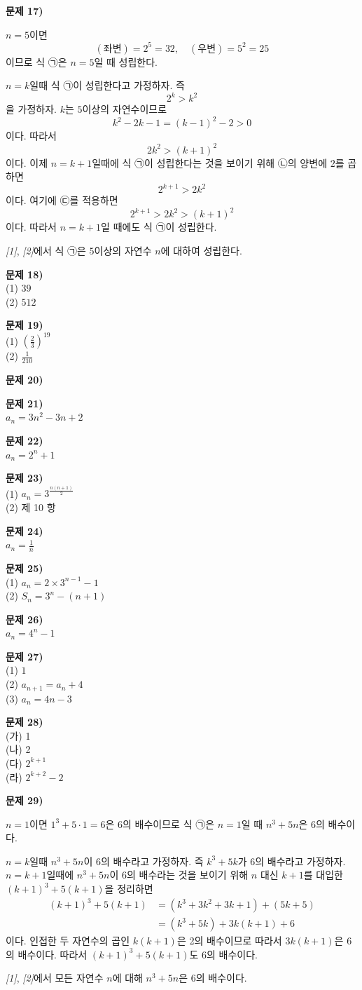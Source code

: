 \documentclass{oblivoir}
\newcounter{num}
\newcommand\an[1]{\par\bigskip\noindent\textbf{문제 #1)}\\}
\begin{document}
%
\an{17}
\begin{enumerate}[label=\emph{[\arabic*]}]
\item
\(n=5\)이면
\[(좌변)=2^5=32,\quad (우변)=5^2=25\]
이므로 식 ㉠은 \(n=5\)일 때 성립한다.
\item
\(n=k\)일때 식 ㉠이 성립한다고 가정하자.
즉
\[2^k>k^2\tag{㉡}\]
을 가정하자.
\(k\)는 \(5\)이상의 자연수이므로
\[k^2-2k-1=(k-1)^2-2>0\tag{㉢}\]
이다.
따라서
\[2k^2>(k+1)^2\]
이다.
이제 \(n=k+1\)일때에 식 ㉠이 성립한다는 것을 보이기 위해 ㉡의 양변에 \(2\)를 곱하면
\[2^{k+1}>2k^2\]
이다.
여기에 ㉢를 적용하면
\[2^{k+1}>2k^2>(k+1)^2\]
이다.
따라서 \(n=k+1\)일 때에도 식 ㉠이 성립한다.
\end{enumerate}
\emph{[1]}, \emph{[2]}에서 식 ㉠은 \(5\)이상의 자연수 \(n\)에 대하여 성립한다.

%
\an{18}
(1) \(39\)\\
(2) \(512\)

%
\an{19}
(1) \(\left(\frac23\right)^{19}\)\\
(2) \(\frac1{210}\)

%
\an{20}

%
\an{21}
\(a_n=3n^2-3n+2\)

%
\an{22}
\(a_n=2^n+1\)

%
\an{23}
(1) \(a_n=3^{\frac{n(n+1)}2}\)\\
(2) 제 10 항

%
\an{24}
\(a_n=\frac1n\)

%
\an{25}
(1) \(a_n=2\times3^{n-1}-1\)\\
(2) \(S_n=3^n-(n+1)\)

%
\an{26}
\(a_n=4^n-1\)

%
\an{27}
(1) \(1\)\\
(2) \(a_{n+1}=a_n+4\)\\
(3) \(a_n=4n-3\)

%
\an{28}
(가) 1\\
(나) 2\\
(다) \(2^{k+1}\)\\
(라) \(2^{k+2}-2\)

%
\an{29}
\begin{enumerate}[label=\emph{[\arabic*]}]
\item
\(n=1\)이면
\(1^3+5\cdot1=6\)은 6의 배수이므로 식 ㉠은 \(n=1\)일 때 \(n^3+5n\)은 6의 배수이다.
\item
\(n=k\)일때 \(n^3+5n\)이 6의 배수라고 가정하자.
즉 \(k^3+5k\)가 6의 배수라고 가정하자.
\(n=k+1\)일때에 \(n^3+5n\)이 6의 배수라는 것을 보이기 위해 \(n\) 대신 \(k+1\)를 대입한 \((k+1)^3+5(k+1)\)을 정리하면
\begin{align*}
(k+1)^3+5(k+1)
&=(k^3+3k^2+3k+1)+(5k+5)\\
&=(k^3+5k)+3k(k+1)+6
\end{align*}
이다.
인접한 두 자연수의 곱인 \(k(k+1)\)은 2의 배수이므로 따라서 \(3k(k+1)\)은 6의 배수이다.
따라서 \((k+1)^3+5(k+1)\)도 6의 배수이다.
\end{enumerate}
\emph{[1]}, \emph{[2]}에서 모든 자연수 \(n\)에 대해 \(n^3+5n\)은 6의 배수이다.
\end{document}
